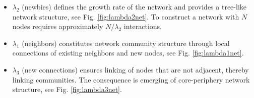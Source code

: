 %
%
%
%
%

\begin{itemize}
	\item $\lambda_2$ (newbies) defines the growth rate of the network and provides a tree-like network structure, see Fig. \ref{fig:lambda2net}. To construct a network with $N$ nodes requires approximately $N/$$\lambda_2$ interactions.
	\item $\lambda_1$ (neighbors) constitutes network community structure through local connections of existing neighbors and new nodes, see Fig. \ref{fig:lambda1net}.
	\item $\lambda_3$ (new connections) ensures linking of nodes that are not adjacent, thereby linking communities. The consequence is emerging of core-periphery network structure, see Fig. \ref{fig:lambda3net}.
\end{itemize}


%

